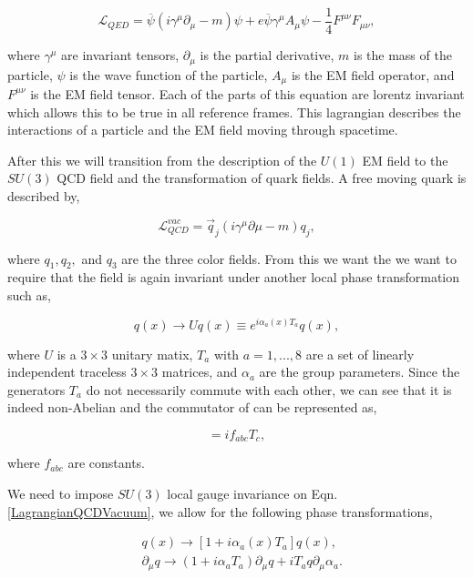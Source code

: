  \begin{equation}\label{LagrangianQED}
\mathcal{L}_{QED}=\overline{\psi}(i\gamma^\mu\partial_\mu-m)\psi+e\overline{\psi}\gamma^{\mu}A_{\mu}\psi-\frac{1}{4}F^{\mu\nu}F_{\mu\nu},
 \end{equation}

where $\gamma^\mu$ are invariant tensors, $\partial_\mu$ is the partial derivative, $m$ is the mass of the particle, $\psi$ is the wave function of the particle, $A_{\mu}$ is the EM field operator, and $F^{\mu\nu}$ is the EM field tensor. Each of the parts of this equation are lorentz invariant which allows this to be true in all reference frames. This lagrangian describes the interactions of a particle and the EM field moving through spacetime. 

After this we will transition from the description of the $U(1)$ EM field to the $SU(3)$ QCD field and the transformation of quark fields. A free moving quark is described by,

\begin{equation}\label{LagrangianQCDVacuum}
\mathcal{L}_{QCD}^{vac}=\overrightarrow{q}_j(i\gamma^\mu\partial\mu-m)q_j,
\end{equation}

where $q_1, q_2,$ and $q_3$ are the three color fields. From this we want the we want to require that the field is again invariant under another local phase transformation such as,

\begin{equation}
q(x)\rightarrow Uq(x)\equiv e^{i\alpha_a(x)T_a}q(x),
\end{equation}

where $U$ is a $3\times3$ unitary matix, $T_a$ with $a=1,...,8$ are a set of linearly independent traceless $3\times3$ matrices, and $\alpha_a$ are the group parameters. Since the generators $T_a$ do not necessarily commute with each other, we can see that it is indeed non-Abelian and the commutator of can be represented as,

\begin{equation}
[T_a, T_b]=if_{abc}T_c,
\end{equation}

where $f_{abc}$ are constants. 

We need to impose $SU(3)$ local gauge invariance on Eqn. \ref{LagrangianQCDVacuum}, we allow for the following phase transformations,

\begin{equation}
\begin{split}
& q(x)\rightarrow[1+i\alpha_a(x)T_a]q(x), \\
& \partial_\mu q\rightarrow(1+i\alpha_aT_a)\partial_\mu q+iT_aq\partial_\mu\alpha_a.
\end{split}
\end{equation}

